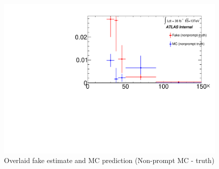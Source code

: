 \documentclass[11pt]{article}
\begin{document}
	\begin{figure}[H]
		\centering
		\includegraphics[width=0.7\linewidth]{figures/FakesEstimate_data_pp8_nonallhad_new_scaledHists/Overlay_FF_tau_pt_nonprompt-truth.pdf}
		\caption{Overlaid fake estimate and MC prediction (Non-prompt MC - truth)}
	\end{figure}	
\end{document}
